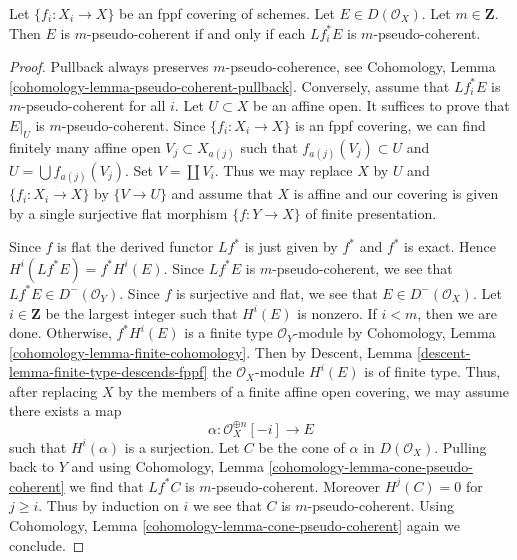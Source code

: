 \begin{lemma}
\label{lemma-pseudo-coherent-descends-fppf}
Let $\{f_i : X_i \to X\}$ be an fppf covering of schemes. Let
$E \in D(\mathcal{O}_X)$. Let $m \in \mathbf{Z}$.
Then $E$ is $m$-pseudo-coherent if and only if each
$Lf_i^*E$ is $m$-pseudo-coherent.
\end{lemma}

\begin{proof}
Pullback always preserves $m$-pseudo-coherence, see
Cohomology, Lemma \ref{cohomology-lemma-pseudo-coherent-pullback}.
Conversely, assume that $Lf_i^*E$ is $m$-pseudo-coherent for all $i$.
Let $U \subset X$ be an affine open. It suffices to prove that
$E|_U$ is $m$-pseudo-coherent. Since $\{f_i : X_i \to X\}$ is an
fppf covering, we can find finitely many affine open $V_j \subset X_{a(j)}$
such that $f_{a(j)}(V_j) \subset U$ and $U = \bigcup f_{a(j)}(V_j)$.
Set $V = \coprod V_i$.
Thus we may replace $X$ by $U$ and $\{f_i : X_i \to X\}$ by
$\{V \to U\}$ and assume that $X$ is affine and our covering
is given by a single surjective flat morphism $\{f : Y \to X\}$
of finite presentation.

\medskip\noindent
Since $f$ is flat the derived functor $Lf^*$ is just given by $f^*$ and $f^*$
is exact. Hence $H^i(Lf^*E) = f^*H^i(E)$. Since $Lf^*E$ is $m$-pseudo-coherent,
we see that $Lf^*E \in D^-(\mathcal{O}_Y)$. Since $f$ is surjective and flat,
we see that $E \in D^-(\mathcal{O}_X)$. Let $i \in \mathbf{Z}$ be the largest
integer such that $H^i(E)$ is nonzero. If $i < m$, then we are done. Otherwise,
$f^*H^i(E)$ is a finite type $\mathcal{O}_Y$-module by
Cohomology, Lemma \ref{cohomology-lemma-finite-cohomology}.
Then by Descent, Lemma \ref{descent-lemma-finite-type-descends-fppf}
the $\mathcal{O}_X$-module $H^i(E)$ is of finite type.
Thus, after replacing $X$ by the members of a finite affine open covering,
we may assume there exists a map
$$
\alpha : \mathcal{O}_X^{\oplus n}[-i] \longrightarrow E
$$
such that $H^i(\alpha)$ is a surjection. Let $C$ be the cone of $\alpha$
in $D(\mathcal{O}_X)$. Pulling back to $Y$ and using
Cohomology, Lemma \ref{cohomology-lemma-cone-pseudo-coherent}
we find that $Lf^*C$ is $m$-pseudo-coherent. Moreover $H^j(C) = 0$
for $j \geq i$. Thus by induction on $i$ we see that $C$ is
$m$-pseudo-coherent. Using
Cohomology, Lemma \ref{cohomology-lemma-cone-pseudo-coherent}
again we conclude.
\end{proof}